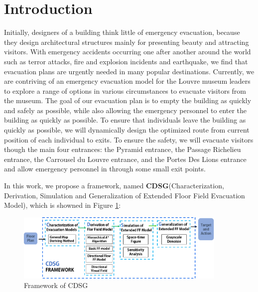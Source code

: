\documentclass{mcmthesis}
\begin{document}
\section{Introduction}
Initially, designers of a building think little of emergency evacuation, because they design architectural structures mainly for presenting beauty and attracting visitors. With emergency accidents occurring one after another around the world such as terror attacks, fire and explosion incidents and earthquake, we find that evacuation plans are urgently needed in many popular destinations. 
Currently, we are contriving of an emergency evacuation model for the Louvre museum leaders to explore a range of options in various circumstances to evacuate visitors from the museum.
The goal of our evacuation plan is to empty the building as quickly and safely as possible, while also allowing the emergency personnel to enter the building as quickly as possible. 
To ensure that individuals leave the building as quickly as possible, we will dynamically design the optimized route from current position of each individual to exits.
To ensure the safety, we will evacuate visitors though the main four entrances: the Pyramid entrance, the Passage Richelieu entrance, the Carrousel du Louvre entrance, and the Portes Des Lions entrance and allow emergency personnel in through some small exit points.

In this work, we propose a framework, named \textbf{CDSG}(Characterization, Derivation, Simulation and Generalization of Extended Floor Field Evacuation Model), which is showned in Figure \ref{frame}: 
\begin{figure}[H]
    \centering
    \includegraphics[width=0.9\textwidth]{framework.png}
    \caption{Framework of CDSG}
    \label{frame}
\end{figure}
\end{document}
